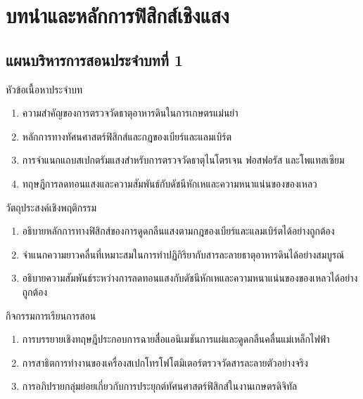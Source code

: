 \chapter{บทนำและหลักการฟิสิกส์เชิงแสง}
\label{chap:ch01}

\section*{แผนบริหารการสอนประจำบทที่ 1}

\begin{planbox}{หัวข้อเนื้อหาประจำบท}
\begin{enumerate}[leftmargin=1.5em, itemsep=1pt]
    \item ความสำคัญของการตรวจวัดธาตุอาหารดินในการเกษตรแม่นยำ
    \item หลักการทางทัศนศาสตร์ฟิสิกส์และกฎของเบียร์และแลมเบิร์ต
    \item การจำแนกแถบสเปกตรัมแสงสำหรับการตรวจวัดธาตุไนโตรเจน ฟอสฟอรัส และโพแทสเซียม
    \item ทฤษฎีการลดทอนแสงและความสัมพันธ์กับดัชนีหักเหและความหนาแน่นของของเหลว
\end{enumerate}
\end{planbox}

\begin{planbox}{วัตถุประสงค์เชิงพฤติกรรม}
\begin{enumerate}[leftmargin=1.5em, itemsep=1pt]
    \item อธิบายหลักการทางฟิสิกส์ของการดูดกลืนแสงตามกฎของเบียร์และแลมเบิร์ตได้อย่างถูกต้อง
    \item จำแนกความยาวคลื่นที่เหมาะสมในการทำปฏิกิริยากับสารละลายธาตุอาหารดินได้อย่างสมบูรณ์
    \item อธิบายความสัมพันธ์ระหว่างการลดทอนแสงกับดัชนีหักเหและความหนาแน่นของของเหลวได้อย่างถูกต้อง
\end{enumerate}
\end{planbox}

\begin{planbox}{กิจกรรมการเรียนการสอน}
\begin{enumerate}[leftmargin=1.5em, itemsep=1pt]
    \item การบรรยายเชิงทฤษฎีประกอบการฉายสื่อแอนิเมชันการแผ่และดูดกลืนคลื่นแม่เหล็กไฟฟ้า
    \item การสาธิตการทำงานของเครื่องสเปกโทรโฟโตมิเตอร์ตรวจวัดสารละลายตัวอย่างจริง
    \item การอภิปรายกลุ่มย่อยเกี่ยวกับการประยุกต์ทัศนศาสตร์ฟิสิกส์ในงานเกษตรดิจิทัล
\end{enumerate}
\end{planbox}

